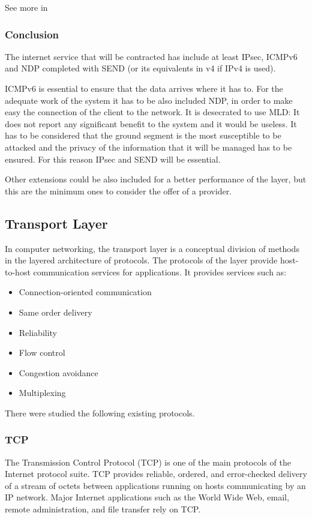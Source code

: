 See more in \cite{MLD}

\subsubsection{Conclusion}
The internet service that will be contracted has include at least IPsec, ICMPv6 and NDP completed with SEND (or its equivalents in v4 if IPv4 is used).

ICMPv6 is essential to ensure that the data arrives where it has to. For the adequate work of the system it has to be also included  NDP, in order to make easy the connection of the client to the network. It is desecrated to use MLD: It does not report any significant benefit to the system and it would be useless. It has to be considered that the ground segment is the most susceptible to be attacked and the privacy of the information that it will be managed has to be ensured. For this reason IPsec and SEND will be essential.

Other extensions could be also included for a better performance of the layer, but this are the minimum ones to consider the offer of a provider.

\subsection{Transport Layer}
In computer networking, the transport layer is a conceptual division of methods in the layered architecture of protocols.  The protocols of the layer provide host-to-host communication services for applications. It provides services such as:
\begin{itemize}
\item Connection-oriented communication
\item Same order delivery
\item Reliability
\item Flow control
\item Congestion avoidance
\item Multiplexing
\end{itemize}

There were studied the following existing protocols.

\subsubsection{TCP}
The Transmission Control Protocol (TCP) is one of the main protocols of the Internet protocol suite. TCP provides reliable, ordered, and error-checked delivery of a stream of octets between applications running on hosts communicating by an IP network. Major Internet applications such as the World Wide Web, email, remote administration, and file transfer rely on TCP.

